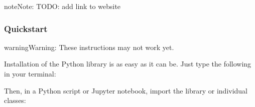 \documentclass[letterpaper,10pt,english]{sphinxmanual}
\begin{document}
\begin{sphinxadmonition}{note}{Note:}
\sphinxAtStartPar
TODO: add link to website
\end{sphinxadmonition}
\subsubsection*{Quickstart}

\begin{sphinxadmonition}{warning}{Warning:}
\sphinxAtStartPar
These instructions may not work yet.
\end{sphinxadmonition}

\sphinxAtStartPar
Installation of the  Python library is as easy as it can be. Just
type the following in your terminal:

\begin{sphinxVerbatim}[commandchars=\\\{\}]
  
\end{sphinxVerbatim}

\sphinxAtStartPar
Then, in a Python script or Jupyter notebook,
import the library or individual classes:

\begin{sphinxVerbatim}[commandchars=\\\{\}]
    

     
     

   

  
\end{sphinxVerbatim}
\end{document}
